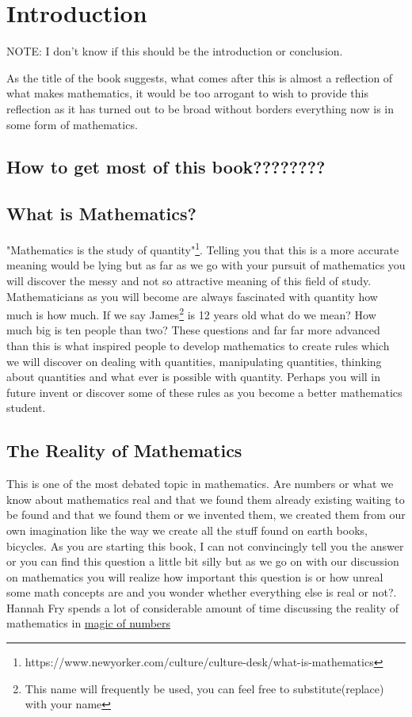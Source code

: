 \chapter{Introduction} %
NOTE: I don't know if this should be the introduction or conclusion.

As the title of the book suggests, what comes after this is almost a reflection of what makes mathematics, it would be too arrogant to wish to provide this reflection as it has turned out to be broad without borders everything now is in some form of mathematics.
\section{How to get most of this book????????}
\section{What is Mathematics?}
"Mathematics is the study of quantity"\footnote[1]{https://www.newyorker.com/culture/culture-desk/what-is-mathematics}. Telling you that this is a more accurate meaning would be lying but as far as we go with your pursuit of mathematics you will discover the messy and not so attractive meaning of this field of study. Mathematicians as you will become are always fascinated with quantity how much is how much. If we say James\footnote[1]{This name will frequently be used, you can feel free to substitute(replace) with your name} is 12 years old what do we mean? How much big is ten people than two? These questions and far far more advanced than this is what inspired people to develop mathematics to create rules which we will discover on dealing with quantities, manipulating quantities, thinking about quantities and what ever is possible with quantity. Perhaps you will in future invent or discover some of these rules as you become a better mathematics student.

\section{The Reality of Mathematics}
This is one of the most debated topic in mathematics. Are numbers or what we know about mathematics real and that we found them already existing waiting to be found and that we found them or we invented them, we created them from our own imagination like the way we create all the stuff found on earth books, bicycles. As you are starting this book, I can not convincingly tell you the answer or you can find this question a little bit silly but as we go on with our discussion on mathematics you will realize how important this question is or how unreal some math concepts are and you wonder whether everything else is real or not?. Hannah Fry spends a lot of considerable amount of time discussing the reality of mathematics in \href{https://www.youtube.com/watch?v=cyvDG8qjt-M&list=PLVk3tArtG-kju2RYzpvh99RiL8hHA9ORV}{magic of numbers}
